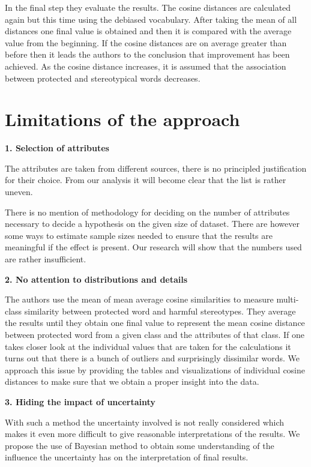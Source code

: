 \documentclass[12pt,]{book}
\begin{document}
In the final step they evaluate the results. The cosine distances are
calculated again but this time using the debiased vocabulary. After
taking the mean of all distances one final value is obtained and then it
is compared with the average value from the beginning. If the cosine
distances are on average greater than before then it leads the authors
to the conclusion that improvement has been achieved. As the cosine
distance increases, it is assumed that the association between protected
and stereotypical words decreases.

\newpage

\section{Limitations of the approach}\label{limitations-of-the-approach}

\textbf{1. Selection of attributes}

The attributes are taken from different sources, there is no principled
justification for their choice. From our analysis it will become clear
that the list is rather uneven.

There is no mention of methodology for deciding on the number of
attributes necessary to decide a hypothesis on the given size of
dataset. There are however some ways to estimate sample sizes needed to
ensure that the results are meaningful if the effect is present. Our
research will show that the numbers used are rather insufficient.

\textbf{2. No attention to distributions and details}

The authors use the mean of mean average cosine similarities to measure
multi-class similarity between protected word and harmful stereotypes.
They average the results until they obtain one final value to represent
the mean cosine distance between protected word from a given class and
the attributes of that class. If one takes closer look at the individual
values that are taken for the calculations it turns out that there is a
bunch of outliers and surprisingly dissimilar words. We approach this
issue by providing the tables and visualizations of individual cosine
distances to make sure that we obtain a proper insight into the data.

\textbf{3. Hiding the impact of uncertainty}

With such a method the uncertainty involved is not really considered
which makes it even more difficult to give reasonable interpretations of
the results. We propose the use of Bayesian method to obtain some
understanding of the influence the uncertainty has on the interpretation
of final results.
\end{document}
